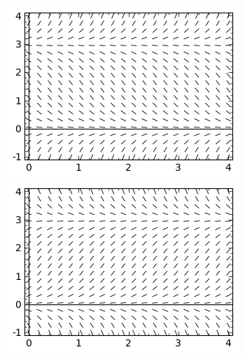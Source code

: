 \documentclass[11pt]{exam}
\begin{document}
\begin{questions}
\begin{figure}[ht]
    \includegraphics[width = 0.45\linewidth]{sage2} \hspace{0.08\linewidth}
    \includegraphics[width = 0.45\linewidth]{sage3}
\end{figure}
        



\end{questions}
\end{document}
